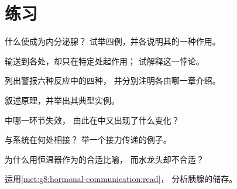 \section{练习}

\begin{exercise}[$\star$]\label{exo:g8:hormonal-communication:1}
什么使成为内分泌腺？
试举四例，并各说明其的一种作用。
\end{exercise}

\begin{exercise}[$\star$]\label{exo:g8:hormonal-communication:2}
输送到各处，却只在特定处起作用；
试解释这一悖论。
\end{exercise}

\begin{exercise}[$\star$]\label{exo:g8:hormonal-communication:3}
列出警报六种反应中的四种，
并分别注明各由哪一章介绍。
\end{exercise}

\begin{exercise}[$\star$]\label{exo:g8:hormonal-communication:4}
叙述原理，并举出其典型实例。
\end{exercise}

\begin{exercise}[$\star$]\label{exo:g8:hormonal-communication:5}
中哪一环节失效，
由此在中又出现了什么变化？
\end{exercise}

\begin{exercise}[$\star$]\label{exo:g8:hormonal-communication:6}
与系统在何处相接？
举一个接力传递的例子。
\end{exercise}

\begin{exercise}[$\star\star$]\label{exo:g8:hormonal-communication:7}
为什么用恒温器作为的合适比喻，
而水龙头却不合适？
\end{exercise}

\begin{exercise}[$\star\star$]\label{exo:g8:hormonal-communication:8}
运用\cref{met:g8:hormonal-communication:read}，
分析胰腺的储存。
\end{exercise}

